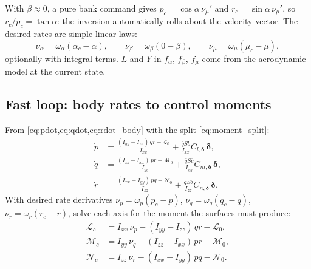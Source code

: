 \documentclass[11pt]{report}
\numberwithin{equation}{chapter}
\newcommand{\vb}[1]{\bm{#1}}
\begin{document}
With $\beta \approx 0$, a pure bank command gives $p_c = \cos\alpha\,\nu_\mu'$ and
$r_c = \sin\alpha\,\nu_\mu'$, so $r_c/p_c = \tan\alpha$: the inversion automatically rolls
about the velocity vector. The desired rates are simple linear laws:
\begin{equation}
  \nu_\alpha = \omega_\alpha(\alpha_c - \alpha),\qquad
  \nu_\beta = \omega_\beta(0 - \beta),\qquad
  \nu_\mu = \omega_\mu(\mu_c - \mu),
\end{equation}
optionally with integral terms. $L$ and $Y$ in $f_\alpha$, $f_\beta$, $f_\mu$ come from the
aerodynamic model at the current state.

\subsection{Fast loop: body rates to control moments}

From \cref{eq:pdot,eq:qdot,eq:rdot_body} with the split \cref{eq:moment_split}:
\begin{align}
  \dot p &= \frac{(I_{yy}-I_{zz})\,q r + \mathcal L_0}{I_{xx}} + \frac{\bar q S b}{I_{xx}}C_{l,\vb\delta}\,\vb\delta, \\
  \dot q &= \frac{(I_{zz}-I_{xx})\,p r + \mathcal M_0}{I_{yy}} + \frac{\bar q S \bar c}{I_{yy}}C_{m,\vb\delta}\,\vb\delta, \\
  \dot r &= \frac{(I_{xx}-I_{yy})\,p q + \mathcal N_0}{I_{zz}} + \frac{\bar q S b}{I_{zz}}C_{n,\vb\delta}\,\vb\delta .
\end{align}
With desired rate derivatives $\nu_p = \omega_p(p_c - p)$, $\nu_q = \omega_q(q_c - q)$,
$\nu_r = \omega_r(r_c - r)$, solve each axis for the moment the surfaces must produce:
\begin{align}
  \mathcal L_c &= I_{xx}\,\nu_p - (I_{yy}-I_{zz})\,q r - \mathcal L_0, \\
  \mathcal M_c &= I_{yy}\,\nu_q - (I_{zz}-I_{xx})\,p r - \mathcal M_0, \\
  \mathcal N_c &= I_{zz}\,\nu_r - (I_{xx}-I_{yy})\,p q - \mathcal N_0 .
\end{align}
\end{document}
